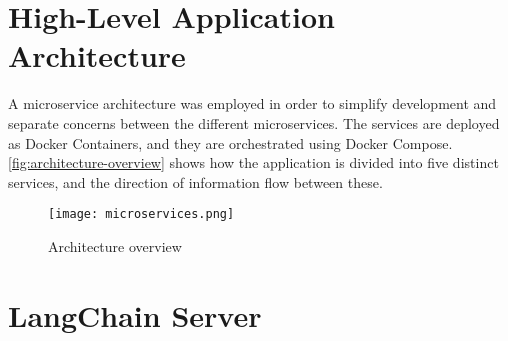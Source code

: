 \begin{comment}
\textit{Phasellus sed ipsum nunc. Nam iaculis felis mauris, sit amet condimentum ex malesuada at. Morbi lacinia odio mi, sit amet pellentesque ante facilisis sit amet. In lobortis elit ut dictum mollis. Aliquam erat volutpat. Morbi sit amet metus nisi. Nulla auctor varius metus at rhoncus. Pellentesque porta mollis leo, eu ultricies nulla mollis ac. Vivamus interdum ac odio vitae sodales. Aenean finibus eros rhoncus molestie elementum. Integer maximus erat vitae purus lobortis iaculis. Etiam blandit varius nulla, sed euismod felis.}

Clearly, a figure showing the architecture is a must, such as Figure~\ref{fig:Architecture}.
Describe all parts of such a figure in reasonable detail in the text, possibly with forward pointers to sections where they will be elaborated on (or backward pointers to sections where tools and methods already have been introduced).
Mention work that motivated your architectural choices, parameter settings, etc.
Those choices should then also be discussed and elaborated on in the Discussion chapter.

\begin{figure}[t!]
    \centering
    \missingfigure{Architecture figure to be added}
    \caption{The missing architecture}
    \label{fig:Architecture}
\end{figure}
\end{comment}

\section{High-Level Application Architecture}

A microservice architecture was employed in order to simplify development and separate concerns between the different microservices. The services are deployed as Docker Containers, and they are orchestrated using Docker Compose.  \autoref{fig:architecture-overview} shows how the application is divided into five distinct services, and the direction of information flow between these.

\begin{figure}[h]
    \centering
    \texttt{[image: microservices.png]}
    \caption{Architecture overview}
    \label{fig:architecture-overview}
\end{figure}



\section{LangChain Server}\label{sec:langchain}

